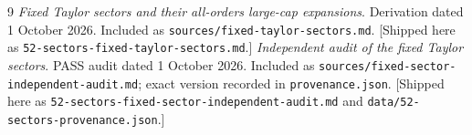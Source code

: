 \documentclass[11pt,letterpaper]{article}
\theoremstyle{remark}\newtheorem{remark}[theorem]{Remark}
\newcommand{\repopath}[1]{\nolinkurl{#1}}
\begin{document}
\begin{thebibliography}{9}
 \emph{Fixed Taylor sectors and their all-orders large-cap expansions}. Derivation dated 1 October 2026. Included as \texttt{sources/fixed-taylor-sectors.md}. [Shipped here as \repopath{52-sectors-fixed-taylor-sectors.md}.]
 \emph{Independent audit of the fixed Taylor sectors}. PASS audit dated 1 October 2026. Included as \texttt{sources/fixed-sector-independent-audit.md}; exact version recorded in \texttt{provenance.json}. [Shipped here as \repopath{52-sectors-fixed-sector-independent-audit.md} and \repopath{data/52-sectors-provenance.json}.]
\end{thebibliography}
\endgroup
\end{document}
